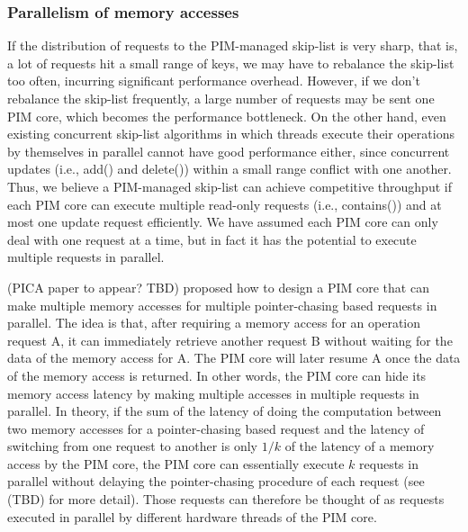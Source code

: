 \documentclass[11pt, letterpaper]{article}   	%
\begin{document}
\subsubsection{Parallelism of memory accesses}
If the distribution of requests to the PIM-managed skip-list is very sharp, that is, 
a lot of requests hit a small range of keys, we may have to rebalance the skip-list too often, 
incurring significant performance overhead. 
However, if we don't rebalance the skip-list frequently, 
a large number of requests may be sent one PIM core, which becomes the performance bottleneck. 
On the other hand, even existing concurrent skip-list algorithms in which threads execute 
their operations by themselves in parallel cannot have good performance either, 
since concurrent updates (i.e., add() and delete()) within a small range conflict with one another. 
Thus, we believe a PIM-managed skip-list can achieve competitive throughput if each PIM core can 
execute multiple read-only requests (i.e., contains()) and at most one update request efficiently. 
We have assumed each PIM core can only deal with one request at a time, 
but in fact it has the potential to execute multiple requests in parallel.

\cite{} (PICA paper to appear? TBD) proposed how to design a PIM core that 
can make multiple memory accesses for multiple pointer-chasing based requests in parallel. 
The idea is that, after requiring a memory access for an operation request A, 
it can immediately retrieve another request B without waiting for the data of the memory access for A. 
The PIM core will later resume A once the data of the memory access is returned.  
In other words, the PIM core can hide its memory access latency by making multiple accesses in 
multiple requests in parallel. 
In theory, if the sum of the latency of doing the computation between two memory accesses 
for a pointer-chasing based request and the latency of switching from one request to another 
is only $1/k$ of the latency of a memory access by the PIM core, 
the PIM core can essentially execute $k$ requests in parallel without 
delaying the pointer-chasing procedure of each request (see \cite{} (TBD) for more detail). 
Those requests can therefore be thought of as requests executed in parallel
by different hardware threads of the PIM core. 
\end{document}

